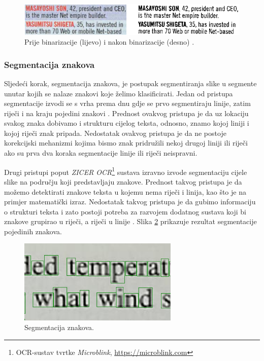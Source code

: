 \documentclass[times, utf8, zavrsni]{fer}
\begin{document}
\

\begin{figure}[htb]
    \centering
    \includegraphics[width=\textwidth]{images/binarization.png}
    \caption{
        Prije binarizacije (lijevo) i nakon binarizacije (desno)
        \citep{Vynckier:2018:HowOcrWorks}.
    }
    \label{fig:binarization}
\end{figure}


\subsubsection{Segmentacija znakova}
\label{subsubsec:segmentacija}
Sljedeći korak, segmentacija znakova, je postupak segmentiranja slike u
segmente unutar kojih se nalaze znakovi koje želimo klasificirati. Jedan od
pristupa segmentacije izvodi se s vrha prema dnu gdje se prvo segmentiraju
linije, zatim riječi i na kraju pojedini znakovi \citep{Jurin:2017:Master}
\citep{Vynckier:2018:HowOcrWorks}. Prednost ovakvog pristupa je da uz lokaciju
svakog znaka dobivamo i strukturu cijelog teksta, odnosno, znamo kojoj liniji i
kojoj riječi znak pripada. Nedostatak ovakvog pristupa je da ne postoje
korekcijski mehanizmi kojima bismo znak pridružili nekoj drugoj liniji ili
riječi ako su prva dva koraka segmentacije linije ili riječi neispravni.
\citep{Jurin:2017:Master}

Drugi pristupi poput \emph{ZICER OCR}\footnote{OCR-sustav tvrtke
\emph{Microblink}, \url{https://microblink.com}} sustava izravno
izvode segmentaciju cijele slike na području koji predstavljaju znakove.
Prednost takvog pristupa je da možemo detektirati znakove teksta u kojemu nema
riječi i linija, kao što je na primjer matematički izraz. Nedostatak takvog
pristupa je da gubimo informaciju o strukturi teksta i zato postoji potreba za
razvojem dodatnog sustava koji bi znakove grupirao u riječi, a riječi u linije
\citep{Jurin:2017:Master}. Slika \ref{fig:segmentation} prikazuje rezultat
segmentacije pojedinih znakova.

\begin{figure}[htb]
    \centering
    \includegraphics[height=4cm]{images/segmentation.png}
    \caption{Segmentacija znakova.}
    \label{fig:segmentation}
\end{figure}
\end{document}
